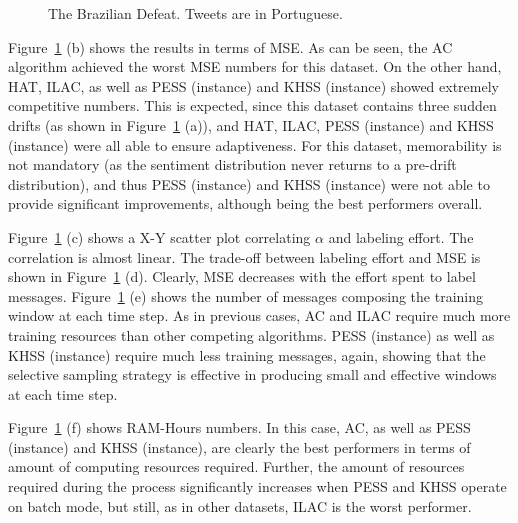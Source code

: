 \begin{figure}[htb]
\caption{The Brazilian Defeat. Tweets are in Portuguese.}
\label{fig:por}
\end{figure}

Figure~\ref{fig:por} (b) shows the results in terms of MSE.%
As can be seen, the AC algorithm achieved the worst MSE numbers for this dataset. On the other hand, HAT, ILAC, as well as PESS (instance) and KHSS (instance) showed extremely competitive numbers. This is expected, since this dataset contains three sudden drifts (as shown in Figure~\ref{fig:por} (a)), and HAT, ILAC, PESS (instance) and KHSS (instance) were all able to ensure adaptiveness.
For this dataset, memorability is not mandatory (as the sentiment distribution never returns to a pre-drift
distribution), and thus PESS (instance) and KHSS (instance) were not able to provide significant improvements, although being the best performers overall.

Figure~\ref{fig:por} (c) shows a X-Y scatter plot correlating $\alpha$ and labeling effort. The correlation is almost linear. The trade-off between labeling effort and MSE is shown in Figure~\ref{fig:por} (d). Clearly, MSE decreases with the effort spent to label messages.
Figure~\ref{fig:por} (e) shows the number of messages composing the training window at each time step.
As in previous cases, AC and ILAC require much more training resources than other competing algorithms. PESS (instance) as well as KHSS (instance) require much less training messages, again, showing that the selective sampling strategy is effective in producing small and effective windows at each time step.

Figure~\ref{fig:por} (f)
shows RAM-Hours numbers. In this case, AC, as well as PESS (instance) and KHSS (instance), are clearly the best performers in terms of amount of computing resources required. Further, the amount of resources required during the process significantly increases when PESS and KHSS operate on batch mode, but still, as in other datasets, ILAC is the worst performer.

